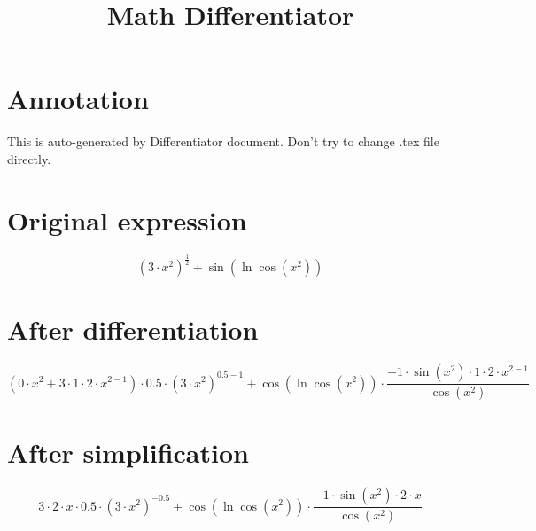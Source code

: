 \documentclass{article}
\title{\textbf{Math Differentiator}}
\date{}
\author{\text{Kaplin Artyom, B01-402}}
\begin{document}
\maketitle
\section*{Annotation}
This is auto-generated by Differentiator document. Don't try to change .tex file directly.

\section*{Original expression}

\[\left({3}{\cdot}{x}^{{2}}\right)^{\frac{{1}}{{2}}}{+}\sin{\left(\ln{\cos{\left({x}^{{2}}\right)}}\right)}\]

\section*{After differentiation}

\[\left({0}{\cdot}{x}^{{2}}{+}{3}{\cdot}{1}{\cdot}{2}{\cdot}{x}^{{2}{-}{1}}\right){\cdot}{0.5}{\cdot}\left({3}{\cdot}{x}^{{2}}\right)^{{0.5}{-}{1}}{+}\cos{\left(\ln{\cos{\left({x}^{{2}}\right)}}\right)}{\cdot}\frac{{-1}{\cdot}\sin{\left({x}^{{2}}\right)}{\cdot}{1}{\cdot}{2}{\cdot}{x}^{{2}{-}{1}}}{\cos{\left({x}^{{2}}\right)}}\]

\section*{After simplification}

\[{3}{\cdot}{2}{\cdot}{x}{\cdot}{0.5}{\cdot}\left({3}{\cdot}{x}^{{2}}\right)^{{-0.5}}{+}\cos{\left(\ln{\cos{\left({x}^{{2}}\right)}}\right)}{\cdot}\frac{{-1}{\cdot}\sin{\left({x}^{{2}}\right)}{\cdot}{2}{\cdot}{x}}{\cos{\left({x}^{{2}}\right)}}\]
\end{document}
